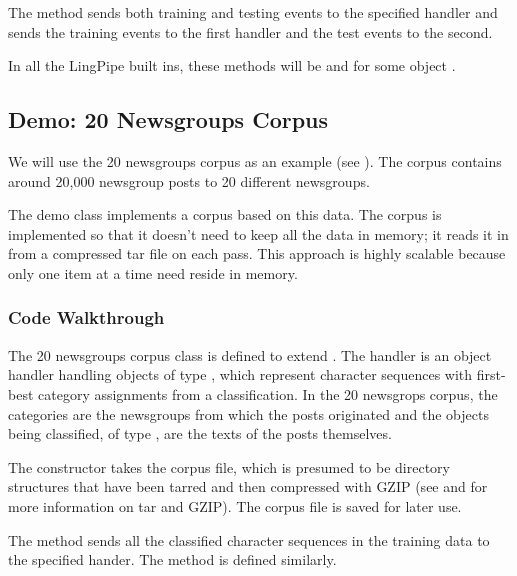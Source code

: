 The method  sends both training and testing
events to the specified handler and  sends the
training events to the first handler and the test events to the
second.

In all the LingPipe built ins, these methods will be
 and
 for some object .

\subsection{Demo: 20 Newsgroups Corpus}\label{section:corpus-20-newsgroups-corpus}

We will use the 20 newsgroups corpus as an example (see
).  The corpus contains around 20,000
newsgroup posts to 20 different newsgroups.

The demo class  implements a corpus based
on this data.  The corpus is implemented so that it doesn't need to
keep all the data in memory; it reads it in from a compressed tar file
on each pass.  This approach is highly scalable because only one item
at a time need reside in memory.

\subsubsection{Code Walkthrough}

The 20 newsgroups corpus class is defined to extend .
%
%
The handler is an object handler handling objects of type
, which represent character sequences
with first-best category assignments from a classification.
In the 20 newsgrops corpus, the categories are the newsgroups from
which the posts originated and the objects being classified,
of type , are the texts of the posts themselves.

The constructor takes the corpus file, which is presumed to be
directory structures that have been tarred and then compressed with
GZIP (see  and  for more information on
tar and GZIP).  The corpus file is saved for later use.  

The  method sends all the classified character
sequences in the training data to the specified hander.
%
%
The  method is defined similarly.  

